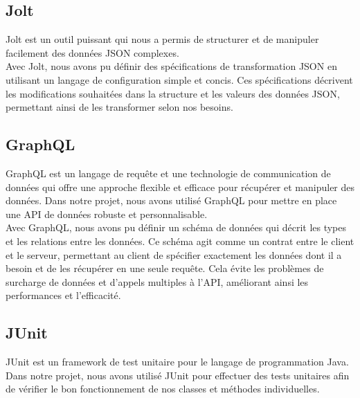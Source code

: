 
\subsection*{Jolt}
Jolt est un outil puissant qui nous a permis de structurer et de manipuler facilement des données JSON complexes.\\

Avec Jolt, nous avons pu définir des spécifications de transformation JSON en utilisant un langage de configuration simple et concis. Ces spécifications décrivent les modifications souhaitées dans la structure et les valeurs des données JSON, permettant ainsi de les transformer selon nos besoins.


\subsection*{GraphQL}
GraphQL est un langage de requête et une technologie de communication de données qui offre une approche flexible et efficace pour récupérer et manipuler des données. Dans notre projet, nous avons utilisé GraphQL pour mettre en place une API de données robuste et personnalisable.\\

Avec GraphQL, nous avons pu définir un schéma de données qui décrit les types et les relations entre les données. Ce schéma agit comme un contrat entre le client et le serveur, permettant au client de spécifier exactement les données dont il a besoin et de les récupérer en une seule requête. Cela évite les problèmes de surcharge de données et d'appels multiples à l'API, améliorant ainsi les performances et l'efficacité.

\subsection*{JUnit}
JUnit est un framework de test unitaire pour le langage de programmation Java. Dans notre projet, nous avons utilisé JUnit pour effectuer des tests unitaires afin de vérifier le bon fonctionnement de nos classes et méthodes individuelles.\\

